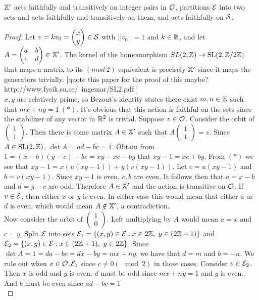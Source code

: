 \documentclass[]{article}
\begin{document}
\begin{lem}
$\mathbb{X}'$ acts faithfully and transitively on integer pairs in $\mathcal{O}$, partitions $\mathcal{E}$ into two sets and acts faithfully and transitively on them, and acts faithfully on $\mathcal{S}$.
\begin{proof}
Let $v=kv_0=\begin{pmatrix}x \\ y\end{pmatrix}\in\mathcal{S}$ with $||v_0||=1$ and $k\in\mathbb{R}$, and let $A=\begin{pmatrix}a & b \\ c & d
\end{pmatrix}\in\mathbb{X}'$. The kernel of the homomorphism $SL(2, \mathbb{Z})\rightarrow \mathrm{SL}(2,\mathbb{Z}/2\mathbb{Z})$ that maps a matrix to its $(mod~2)$ equivalent is precisely $\mathbb{X}'$ since it maps the generators trivially. [quote this paper for the proof of this maybe? http://www.fysik.su.se/~ingemar/SL2.pdf ]\\
$x,y$ are relatively prime, so Bezout's identity states there exist $m,n\in\mathbb{Z}$ such that $mx+ny=1~(*)$. It's obvious that this action is faithful on the sets since the stabilizer of any vector in $\mathbb{R}^2$ is trivial. Suppose $v\in\mathcal{O}$. Consider the orbit of $\begin{pmatrix}1 \\1 \end{pmatrix}$. Then there is some matrix $A\in\mathbb{X}'$ such that $A\begin{pmatrix}1\\1\end{pmatrix}=v$. Since $A\in\mathrm{SL}(2,\mathbb{Z})$, $\det A = ad-bc=1$. Obtain from $1=(x-b)(y-c)-bc=xy-xc-by$ that $xy-1=xc+by$. From $(*)$ we see that $xy-1=x(u(xy-1))+y(v(xy-1))$. Let $c=u(xy-1)$ and $b=v(xy-1)$. Since $xy-1$ is even, $c,b$ are even. It follows then that $a=x-b$ and $d=y-c$ are odd. Therefore $A\in \mathbb{X}'$ and the action is transitive on $\mathcal{O}$. If $v\in\mathcal{E}$, then either $x$ or $y$ is even. In either case this would mean that either $a$ or $d$ is even, which would mean $A\notin\mathbb{X}'$, a contradiction.\\
Now consider the orbit of $\begin{pmatrix}1\\0\end{pmatrix}$. Left multiplying by $A$ would mean $a=x$ and $c=y$. Split $\mathcal{E}$ into sets $\mathcal{E}_1=\{(x,y)\in\mathcal{E} :x\in2\mathbb{Z},~y\in(2\mathbb{Z}+1) \}$ and $\mathcal{E}_2=\{(x,y)\in\mathcal{E}:x\in(2\mathbb{Z}+1),~y\in2\mathbb{Z} \}$. Since $\det A=1=da-bc=dx-by=mx+ny$, we have that $d=m$ and $b=-n$. We rule out when $v\in\mathcal{O},\mathcal{E}_1$ since $c\neq 0 (\mod 2)$ in those cases. Consider $v\in\mathcal{E}_2$. Then $x$ is odd and $y$ is even. $d$ must be odd since $mx+ny=1$ and $y$ is even. And $b$ must be even since $ad-bc=1$\\

\end{proof}
\end{lem}
\end{document}
